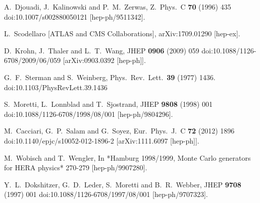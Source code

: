 \documentclass[12pt]{article}
\begin{document}
\begin{thebibliography}{99}
  A.~Djouadi, J.~Kalinowski and P.~M.~Zerwas,
  Z.\ Phys.\ C {\bf 70} (1996) 435
  doi:10.1007/s002880050121
  [hep-ph/9511342].


  L.~Scodellaro [ATLAS and CMS Collaborations],
  arXiv:1709.01290 [hep-ex].


  D.~Krohn, J.~Thaler and L.~T.~Wang,
  JHEP {\bf 0906} (2009) 059
  doi:10.1088/1126-6708/2009/06/059
  [arXiv:0903.0392 [hep-ph]].


  G.~F.~Sterman and S.~Weinberg,
  Phys.\ Rev.\ Lett.\  {\bf 39} (1977) 1436.
  doi:10.1103/PhysRevLett.39.1436


  S.~Moretti, L.~Lonnblad and T.~Sjostrand,
  JHEP {\bf 9808} (1998) 001
  doi:10.1088/1126-6708/1998/08/001
  [hep-ph/9804296].


  M.~Cacciari, G.~P.~Salam and G.~Soyez,
  Eur.\ Phys.\ J.\ C {\bf 72} (2012) 1896
  doi:10.1140/epjc/s10052-012-1896-2
  [arXiv:1111.6097 [hep-ph]].


  M.~Wobisch and T.~Wengler,
  In *Hamburg 1998/1999, Monte Carlo generators for HERA physics* 270-279
  [hep-ph/9907280].


  Y.~L.~Dokshitzer, G.~D.~Leder, S.~Moretti and B.~R.~Webber,
  JHEP {\bf 9708} (1997) 001
  doi:10.1088/1126-6708/1997/08/001
  [hep-ph/9707323].



\end{thebibliography}
\end{document}

